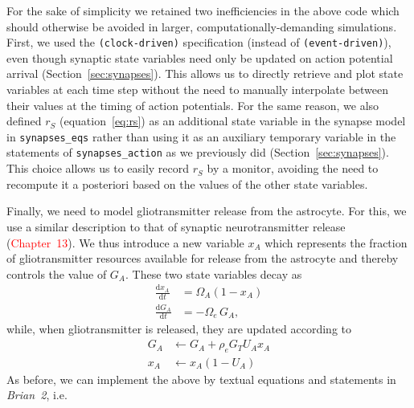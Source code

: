 \documentclass[a4paper, 11pt]{article}
\newcommand{\brian}{\emph{Brian~2}\xspace}
\newcommand{\der}[2]{\frac{\mathrm{d}#1}{\mathrm{d}#2}}
\newcommand*{\secref}[1]{Section~\ref{#1}}
\begin{document}
For the sake of simplicity we retained two inefficiencies in the above code which should otherwise be avoided in larger, computationally-demanding simulations.
First, we used the \lstinline|(clock-driven)| specification (instead of \lstinline|(event-driven)|), even though synaptic state variables need only be updated on action potential arrival (\secref{sec:synapses}). This allows us to directly retrieve and plot state variables at each time step without the need to manually interpolate between their values at the timing of action potentials.
For the same reason, we also defined $r_S$ (equation~\ref{eq:rs}) as an additional state variable in the synapse model in \lstinline|synapses_eqs| rather than using it as an auxiliary temporary variable in the statements of \lstinline|synapses_action| as we previously did (\secref{sec:synapses}).
This choice allows us to easily record $r_S$ by a monitor, avoiding the need to recompute it a posteriori based on the values of the other state variables.

Finally, we need to model gliotransmitter release from the astrocyte.
For this, we use a similar description to that of synaptic neurotransmitter release (\textcolor{red}{Chapter~13}).
We thus introduce a new variable $x_A$ which represents the fraction of gliotransmitter resources available for release from the astrocyte and thereby controls the value of $G_A$. These two state variables decay as \citep{DePitta_PCB11}
\begin{align}
\der{x_A}{t} &= \Omega_A (1-x_A) \\
\der{G_A}{t} & = -\Omega_e\,G_{A},
\end{align}
while, when gliotransmitter is released, they are updated according to
\begin{align}
G_A &\leftarrow G_A + \rho_e G_T U_A x_A\\
x_A &\leftarrow x_A (1 - U_A)
\end{align}
As before, we can implement the above by textual equations and statements in \brian, i.e.

\end{document}
